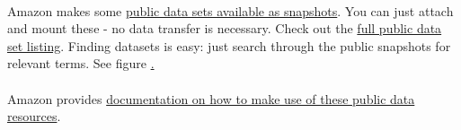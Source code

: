 \paragraph{}Amazon makes some \href{http://aws.amazon.com/publicdatasets/}{public data sets available as snapshots}. You can just attach and mount these - no data transfer is necessary. Check out the \href{http://developer.amazonwebservices.com/connect/kbcategory.jspa?categoryID=243}{full public data set listing}. Finding datasets is easy: just search through the public snapshots for relevant terms. See figure \href{fig:ensembl}.

\paragraph{}Amazon provides \href{http://docs.amazonwebservices.com/AWSEC2/latest/UserGuide/using-public-data-sets.html}{documentation on how to make use of these public data resources}.


\paragraph{}




